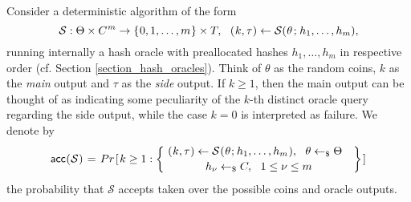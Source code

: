 \documentclass[10pt, psamsfonts, reqno]{amsart}
\theoremstyle{definition}
\theoremstyle{remark}
\numberwithin{equation}{section}
\begin{document}
Consider a deterministic algorithm of the form
\vspace{5pt}
\begin{equation}\label{local_forking_s_form}
\mathcal{S}: \Theta \times C^{\hspace{0.5pt}m} \rightarrow
\{\hspace{0.5pt}0, 1, \dots, m\hspace{0.5pt}\} \times T,
\ \ (
	\hspace{0.5pt}
	k,
	\tau
	\hspace{0.2pt}
)
\leftarrow
\mathcal{S}(
	\hspace{0.4pt}
	\theta
	\hspace{1pt}
	;
	\hspace{1pt}
	h_1,
	\dots,
	h_m
	\hspace{0.0pt}
),
\vspace{5pt}
\end{equation}
running internally a hash oracle
with preallocated hashes $h_1, \dots, h_m$
in respective order (cf. Section \ref{section_hash_oracles}).
Think of $\theta$ as the random coins,
$k$ as the \textit{main} output and
$\tau$ as the \textit{side} output.
If $k \ge 1$, then the main output can be thought of as indicating
some peculiarity of the $k$-th distinct
oracle query regarding the side output,
while the case $k = 0$ is interpreted as failure.
We denote by
\vspace{6pt}
\begin{equation}\label{local_forking_acc}
\mathsf{acc}
	\hspace{0.3pt}
	(
		\hspace{0.3pt}
		\mathcal{S}
		\hspace{0.3pt}
	)
\hspace{1pt}
=
\hspace{1pt}
Pr\hspace{1pt}[\hspace{1pt}k \ge 1 :
\begin{Bmatrix}
\ (
	\hspace{0.4pt}
	k,
	\tau
	\hspace{0.2pt}
)
\leftarrow
\mathcal{S}
	\hspace{0.5pt}
	(
		\hspace{0.5pt}
		\theta
		\hspace{0.5pt}
		;
		\hspace{0.5pt}
		h_1,
		\dots,
		h_m
		\hspace{0.5pt}
	),
\ \ \theta \leftarrow_\$ \Theta\ \ \ \\[2pt]
h_\nu \leftarrow_\$ C,
\ \ 1 \le \nu \le m
\end{Bmatrix}
\hspace{1pt}]\\[6pt]
\end{equation}
the probability that $\mathcal{S}$ accepts
taken over the possible coins and oracle outputs.
\end{document}
